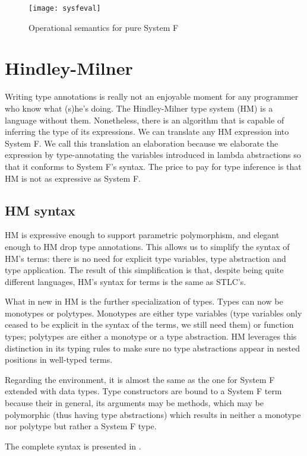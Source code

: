 \begin{figure}
  \centering
  \texttt{[image: sysfeval]}
  \caption{Operational semantics for pure System F}
  \label{sysfeval}
\end{figure}

\section{Hindley-Milner}
Writing type annotations is really not an enjoyable moment for any programmer who know what (s)he's doing. The Hindley-Milner type system (HM) is a language without them. Nonetheless, there is an algorithm that is capable of inferring the type of its expressions. We can translate any HM expression into System F. We call this translation an elaboration because we elaborate the expression by type-annotating the variables introduced in lambda abstractions so that it conforms to System F's syntax. The price to pay for type inference is that HM is not as expressive as System F.
\subsection{HM syntax}

HM is expressive enough to support parametric polymorphism, and elegant enough to HM drop type annotations. This allows us to simplify the syntax of HM's terms: there is no need for explicit type variables, type abstraction and type application. The result of this simplification is that, despite being quite different languages, HM's syntax for terms is the same as STLC's.

What in new in HM is the further specialization of types. Types can now be monotypes or polytypes. Monotypes are either type variables (type variables only ceased to be explicit in the syntax of the terms, we still need them) or function types; polytypes are either a monotype or a type abstraction. HM leverages this distinction in its typing rules to make sure no type abstractions appear in nested positions in well-typed terms.

Regarding the environment, it is almost the same as the one for System F extended with data types. Type constructors are bound to a System F term because their in general, its arguments may be methods, which may be polymorphic (thus having type abstractions) which results in neither a monotype nor polytype but rather a System F type.

The complete syntax is presented in .

